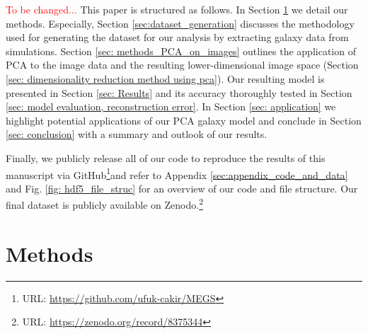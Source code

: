 \documentclass{aa}
\begin{document}


\textcolor{red}{To be changed...}
This paper is structured as follows. In Section \ref{sec:methods} we detail our methods. Especially, Section \ref{sec:dataset_generation} discusses the methodology used for generating the dataset for our analysis by extracting galaxy data from simulations. Section \ref{sec: methods_PCA_on_images} outlines the application of PCA to the image data and the resulting lower-dimensional image space (Section \ref{sec: dimensionality reduction method using pca}). Our resulting model is presented in Section \ref{sec: Results} and its accuracy thoroughly tested in Section \ref{sec: model evaluation, reconstruction error}. In Section \ref{sec: application} we highlight potential applications of our PCA galaxy model and conclude in Section \ref{sec: conclusion} with a summary and outlook of our results.

Finally, we publicly release all of our code to reproduce the results of this manuscript via GitHub\footnote{URL: {\url{https://github.com/ufuk-cakir/MEGS}}}and refer to Appendix \ref{sec:appendix_code_and_data} and Fig. \ref{fig: hdf5_file_struc} for an overview of our code and file structure. Our final dataset is publicly available on Zenodo.\footnote{URL: \url{https://zenodo.org/record/8375344}}

\section{Methods}
\label{sec:methods}
\end{document}
